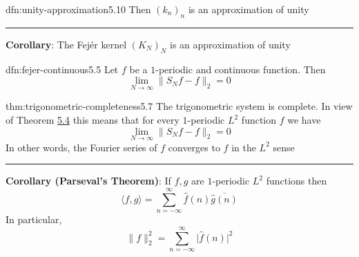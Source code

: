 \documentclass[landscape, 8pt]{extarticle}
\begin{document}
\begin{multicols}{3}
\begin{dfn}{dfn:unity-approximation}{5.10}
	Then $(k_{n})_{n}$ is an approximation of unity

	\noindent\rule{\textwidth}{0.2pt}
	\textbf{Corollary}: The Fejér kernel $(K_{N})_{N}$ is an approximation of unity
\end{dfn}

\begin{lma}[]{dfn:fejer-continuous}{5.5}
	Let $f$ be a $1$-periodic and continuous function. Then
	\[\lim_{N\to \infty} \lVert S_{N} f - f \rVert_{2} = 0\]
\end{lma}

\begin{thm}{thm:trigonometric-completeness}{5.7}
	The trigonometric system is complete. In view of Theorem \hyperref[dfn:complete-orthonormal-system]{5.4} this means that for every $1$-periodic $L^{2}$ function $f$ we have
	\[\lim_{N\to \infty} \lVert S_{N} f - f \rVert_{2} = 0\]
	In other words, the Fourier series of $f$ converges to $f$ in the $L^{2}$ sense

	\noindent\rule{\textwidth}{0.2pt}
	\textbf{Corollary (Parseval's Theorem)}: If $f, g$ are $1$-periodic $L^{2}$ functions then
	\[\langle f, g \rangle = \sum_{n = -\infty}^{\infty} \widehat{f}(n) \overline{\widehat{g}(n)}\]
	In particular,
	\[\lVert f \rVert^{2}_{2} = \sum_{n = -\infty}^{\infty} \lvert \widehat{f}(n) \rvert^{2}\]
\end{thm}


\lipsum[1-12]
\end{multicols}
\end{document}
